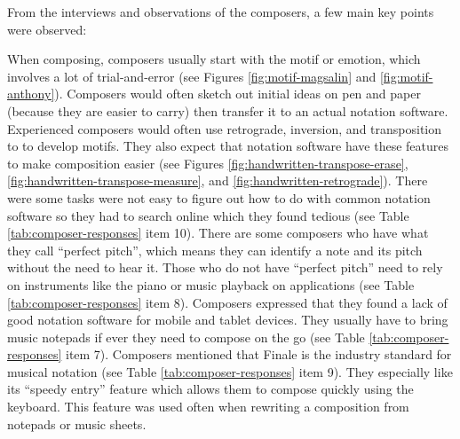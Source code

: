 		From the interviews and observations of the composers, a few main key points were observed:
		\begin{outline}
			\1 When composing, composers usually start with the motif or emotion, which involves a lot of trial-and-error (see Figures \ref{fig:motif-magsalin} and \ref{fig:motif-anthony}). 
			\1 Composers would often sketch out initial ideas on pen and paper (because they are easier to carry) then transfer it to an actual notation software. 
			\1 Experienced composers would often use retrograde, inversion, and transposition to to develop motifs. They also expect that notation software have these features to make composition easier (see Figures \ref{fig:handwritten-transpose-erase}, \ref{fig:handwritten-transpose-measure}, and \ref{fig:handwritten-retrograde}).
			\1 There were some tasks were not easy to figure out how to do with common notation software so they had to search online which they found tedious (see Table \ref{tab:composer-responses} item 10). 
			\1 There are some composers who have what they call ``perfect pitch'', which means they can identify a note and its pitch without the need to hear it. Those who do not have ``perfect pitch'' need to rely on instruments like the piano or music playback on applications (see Table \ref{tab:composer-responses} item 8). 
			\1 Composers expressed that they found a lack of good notation software for mobile and tablet devices. They usually have to bring music notepads if ever they need to compose on the go (see Table \ref{tab:composer-responses} item 7). 
			\1 Composers mentioned that Finale is the industry standard for musical notation (see Table \ref{tab:composer-responses} item 9). They especially like its ``speedy entry'' feature which allows them to compose quickly using the keyboard. This feature was used often when rewriting a composition from notepads or music sheets. 
		\end{outline}

